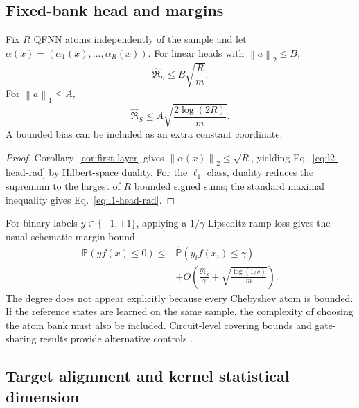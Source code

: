\documentclass[pdflatex,sn-mathphys,NameDate,iicol]{sn-jnl}
\newcommand{\Prob}{\mathbb{P}}
\newcommand{\norm}[1]{\left\lVert #1\right\rVert}
\newcommand{\Rad}{\mathfrak{R}}
\begin{document}
\subsection{Fixed-bank head and margins}

\begin{proposition}
\label{prop:fixed-bank-rad}
Fix $R$ QFNN atoms independently of the sample and let
$\alpha(x)=(\alpha_1(x),\ldots,\alpha_R(x))$. For linear heads with
$\norm a_2\le B$,
\begin{equation}
  \widehat{\Rad}_S
  \le
  B\sqrt{\frac{R}{m}}.
  \label{eq:l2-head-rad}
\end{equation}
For $\norm a_1\le A$,
\begin{equation}
  \widehat{\Rad}_S
  \le
  A\sqrt{\frac{2\log(2R)}{m}}.
  \label{eq:l1-head-rad}
\end{equation}
A bounded bias can be included as an extra constant coordinate.
\end{proposition}

\begin{proof}
Corollary~\ref{cor:first-layer} gives
$\norm{\alpha(x)}_2\le\sqrt R$, yielding
Eq.~\eqref{eq:l2-head-rad} by Hilbert-space duality. For the
$\ell_1$ class, duality reduces the supremum to the largest of $R$
bounded signed sums; the standard maximal inequality gives
Eq.~\eqref{eq:l1-head-rad}.
\end{proof}

For binary labels $y\in\{-1,+1\}$, applying a
$1/\gamma$-Lipschitz ramp loss gives the usual schematic margin bound
\begin{equation}
  \begin{aligned}
  \Prob(yf(x)\le0)
  \le{}&
  \widehat{\Prob}(y_if(x_i)\le\gamma)\\
  &+O\!\left(
    \frac{\widehat{\Rad}_S}{\gamma}
    +
    \sqrt{\frac{\log(1/\delta)}{m}}
  \right).
  \end{aligned}
  \label{eq:margin-bound}
\end{equation}
The degree does not appear explicitly because every Chebyshev atom is
bounded. If the reference states are learned on the same sample, the
complexity of choosing the atom bank must also be included. Circuit-level
covering bounds and gate-sharing results provide alternative controls
\citep{caro2022generalization}.

\subsection{Target alignment and kernel statistical dimension}
\end{document}
